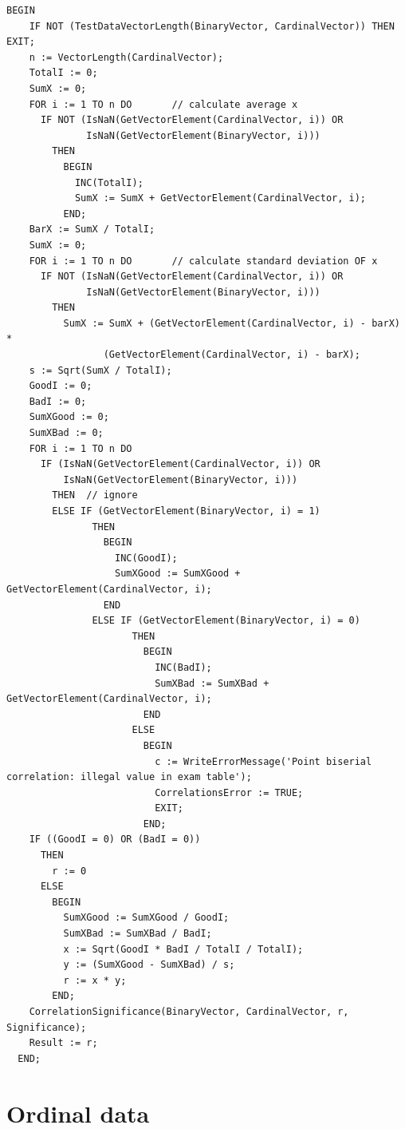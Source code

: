 \begin{refsection}
\begin{lstlisting}[caption=PointBiserial correlation and its significance]
  BEGIN
    IF NOT (TestDataVectorLength(BinaryVector, CardinalVector)) THEN EXIT;
    n := VectorLength(CardinalVector);
    TotalI := 0;
    SumX := 0;
    FOR i := 1 TO n DO       // calculate average x
      IF NOT (IsNaN(GetVectorElement(CardinalVector, i)) OR
              IsNaN(GetVectorElement(BinaryVector, i)))
        THEN
          BEGIN
            INC(TotalI);
            SumX := SumX + GetVectorElement(CardinalVector, i);
          END;
    BarX := SumX / TotalI;
    SumX := 0;
    FOR i := 1 TO n DO       // calculate standard deviation OF x
      IF NOT (IsNaN(GetVectorElement(CardinalVector, i)) OR
              IsNaN(GetVectorElement(BinaryVector, i)))
        THEN
          SumX := SumX + (GetVectorElement(CardinalVector, i) - barX) *
                 (GetVectorElement(CardinalVector, i) - barX);
    s := Sqrt(SumX / TotalI);
    GoodI := 0;
    BadI := 0;
    SumXGood := 0;
    SumXBad := 0;
    FOR i := 1 TO n DO
      IF (IsNaN(GetVectorElement(CardinalVector, i)) OR
          IsNaN(GetVectorElement(BinaryVector, i)))
        THEN  // ignore
        ELSE IF (GetVectorElement(BinaryVector, i) = 1)
               THEN
                 BEGIN
                   INC(GoodI);
                   SumXGood := SumXGood + GetVectorElement(CardinalVector, i);
                 END
               ELSE IF (GetVectorElement(BinaryVector, i) = 0)
                      THEN
                        BEGIN
                          INC(BadI);
                          SumXBad := SumXBad + GetVectorElement(CardinalVector, i);
                        END
                      ELSE
                        BEGIN
                          c := WriteErrorMessage('Point biserial correlation: illegal value in exam table');
                          CorrelationsError := TRUE;
                          EXIT;
                        END;
    IF ((GoodI = 0) OR (BadI = 0))
      THEN
        r := 0
      ELSE
        BEGIN
          SumXGood := SumXGood / GoodI;
          SumXBad := SumXBad / BadI;
          x := Sqrt(GoodI * BadI / TotalI / TotalI);
          y := (SumXGood - SumXBad) / s;
          r := x * y;
        END;
    CorrelationSignificance(BinaryVector, CardinalVector, r, Significance);
    Result := r;
  END;
\end{lstlisting}

\section{Ordinal data}


\end{refsection}
